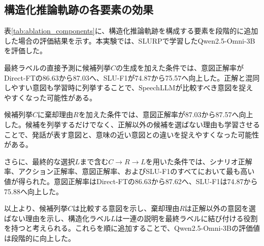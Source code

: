 \documentclass[11pt,a4paper]{ltjsarticle}
\begin{document}
\subsection{構造化推論軌跡の各要素の効果}
表\ref{tab:ablation_components}に、構造化推論軌跡を構成する要素を段階的に追加した場合の評価結果を示す。本実験では、SLURPで学習したQwen2.5-Omni-3Bを評価した。

\begin{table}[htbp]
\centering
\small
\caption{構造化推論軌跡の各要素が評価値に与える影響（SLURPで学習したQwen2.5-Omni-3B）。RG-FTの各条件では、表に示す要素の生成と最終ラベルの直接予測を同時に学習する。}
\label{tab:ablation_components}
\end{table}

最終ラベルの直接予測に候補列挙$C$の生成を加えた条件では、意図正解率がDirect-FTの86.63から87.03へ、SLU-F1が74.87から75.57へ向上した。正解と混同しやすい意図も学習時に列挙することで、SpeechLLMが比較すべき意図を捉えやすくなった可能性がある。

候補列挙$C$に棄却理由$R$を加えた条件では、意図正解率が87.03から87.57へ向上した。候補を列挙するだけでなく、正解以外の候補を選ばない理由も学習させることで、発話が表す意図と、意味の近い意図との違いを捉えやすくなった可能性がある。

さらに、最終的な選択$L$まで含む$C\rightarrow R\rightarrow L$を用いた条件では、シナリオ正解率、アクション正解率、意図正解率、およびSLU-F1のすべてにおいて最も高い値が得られた。意図正解率はDirect-FTの86.63から87.62へ、SLU-F1は74.87から75.88へ向上した。

以上より、候補列挙$C$は比較する意図を示し、棄却理由$R$は正解以外の意図を選ばない理由を示し、構造化ラベル$L$は一連の説明を最終ラベルに結び付ける役割を持つと考えられる。これらを順に追加することで、Qwen2.5-Omni-3Bの評価値は段階的に向上した。
\end{document}
